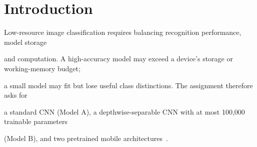 \documentclass[11pt,a4paper]{article}
\begin{document}



\begin{abstract}
This study compares a standard convolutional neural network, a custom depthwise-separable
network, an additional residual depthwise CNN, and two ImageNet-pretrained mobile architectures
for ten-class EuroSAT RGB classification. The five reported final experiments use the saved
70/15/15 split and 64-by-64 inputs. The selected custom lightweight network uses 46,373 trainable
parameters and 18.562 million convolution/linear multiply-accumulates (MACs) per image, compared
with 94,762 parameters and 41.289 million MACs for the standard network. Recalculation from saved
test predictions gives 93.90\% and 94.37\% accuracy, respectively. Model D uses 15,442 trainable
parameters and 4.729 million MACs per image and reaches 93.63\% test accuracy. MobileNetV2 reaches
98.12\% with a recorded 9.180270 MB state dictionary; ShuffleNetV2 x0.5 reaches 96.37\% with
3.231 million MACs. The results support different choices under different storage and accuracy
constraints. They do not establish edge-device latency or robustness across random seeds.
Historical CompactEuroSAT remains separate from the verified five-model comparison. The audit
verifies saved metrics and source-derived costs, but cannot rerun trained-model inference without
the excluded RGB images and trained checkpoints.
\end{abstract}

\tableofcontents

\newpage




\section{Introduction}

Low-resource image classification requires balancing recognition performance, model storage

and computation. A high-accuracy model may exceed a device's storage or working-memory budget;

a small model may fit but lose useful class distinctions. The assignment therefore asks for

a standard CNN (Model A), a depthwise-separable CNN with at most 100,000 trainable parameters

(Model B), and two pretrained mobile architectures~\cite{assignment}.
\end{document}
